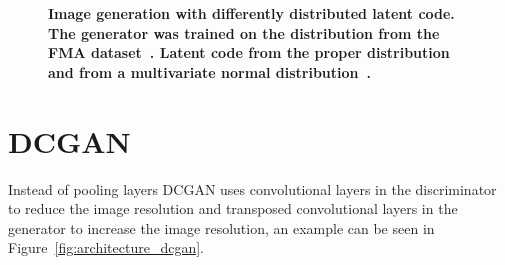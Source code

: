     \begin{figure}[h]
        \centering
        \caption[Image generation with differently distributed latent code]
        {
            \textbf{Image generation with differently distributed latent code. The generator was trained on the distribution from the FMA dataset~\cite{FMA}. Latent code from the proper distribution~ and from a multivariate normal distribution~.}
        }
        \label{fig:distribution}
    \end{figure}
    
    \section{DCGAN}
        Instead of pooling layers DCGAN uses convolutional layers in the discriminator to reduce the image resolution and transposed convolutional layers in the generator to increase the image resolution, an example can be seen in Figure~\ref{fig:architecture_dcgan}.
        
